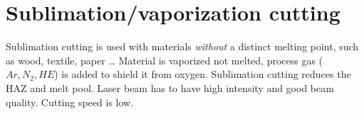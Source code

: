 \section{Sublimation/vaporization cutting}

Sublimation cutting is used with materials \textit{without} a distinct melting point, such as wood, textile, paper \dots
Material is vaporized not melted, process gas ($Ar, N_2, HE$) is added to shield it from oxygen.
Sublimation cutting reduces the HAZ and melt pool. Laser beam has to have high intensity and good beam quality. 
Cutting speed is low.
